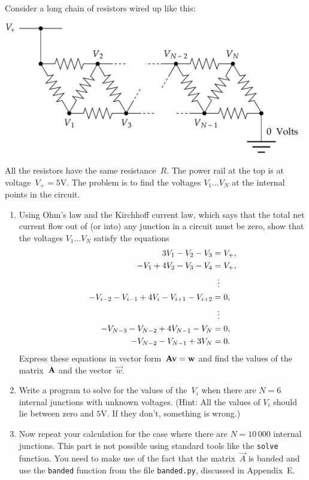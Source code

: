 \documentclass[12pt]{article}
\begin{document}
\begin{exercises}
\exskip Consider a long chain of resistors
wired up like this:
\medskip
\begin{center}
\includegraphics[width=13cm]{reschain.eps}
\end{center}
All the resistors have the same resistance~$R$.  The power rail at the top
is at voltage~$V_+=5$V.  The problem is to find the voltages $V_1\ldots
V_N$ at the internal points in the circuit.
\begin{enumerate}\setlength{\itemsep}{0pt}
\item Using Ohm's law and the Kirchhoff current law, which says that the
  total net current flow out of (or into) any junction in a circuit must be
  zero, show that the voltages $V_1\ldots V_N$ satisfy the equations
\begin{align*}
3V_1 - V_2 - V_3 &= V_+, \\
-V_1 + 4V_2 - V_3 - V_4 &= V_+, \\
                        &\hspace{0.6em}\vdots \\
-V_{i-2} - V_{i-1} + 4V_i - V_{i+1} - V_{i+2} &= 0, \\
                        &\hspace{0.6em}\vdots \\
-V_{N-3} - V_{N-2} + 4V_{N-1} - V_N &= 0, \\
-V_{N-2} - V_{N-1} + 3V_N &= 0.
\end{align*}
Express these equations in vector form~$\mathbf{A}\mathbf{v} = \mathbf{w}$ and find
the values of the matrix~$\mathbf{A}$ and the vector~$\vec{w}$.
\item Write a program to solve for the values of the~$V_i$ when there are
  $N=6$ internal junctions with unknown voltages.  (Hint: All the values of
  $V_i$ should lie between zero and $5$V.  If they don't, something is
  wrong.)
\item Now repeat your calculation for the case where there are $N=10\,000$
  internal junctions.  This part is not possible using standard tools like
  the \verb|solve| function.  You need to make use of the fact that the
  matrix~$\vec{A}$ is banded and use the \verb|banded| function from the
  file \verb|banded.py|, discussed in Appendix~E.
\end{enumerate}



\end{exercises}
\end{document}
